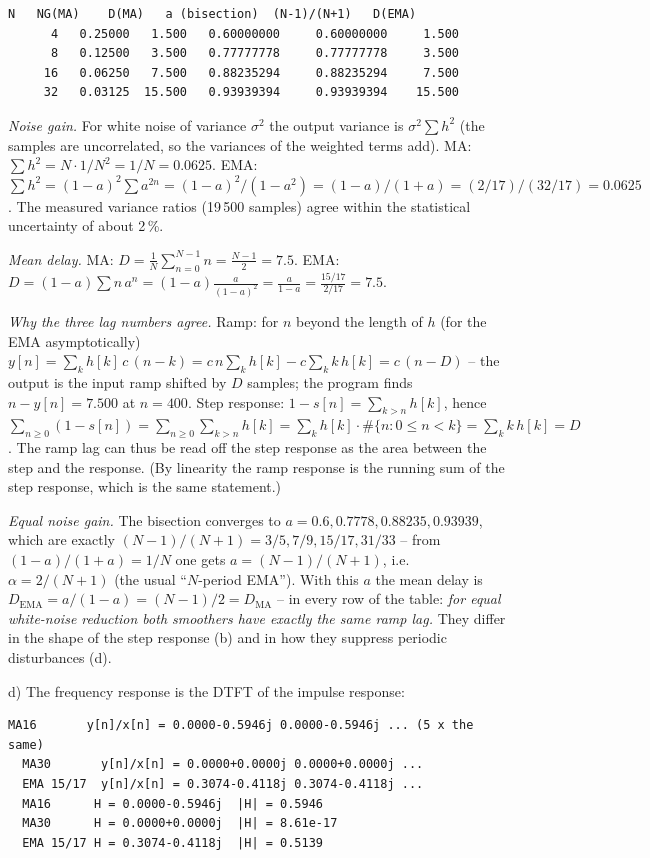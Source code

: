 \begin{solution}
\begin{lstlisting}[style=shell,numbers=none]
      N   NG(MA)    D(MA)   a (bisection)  (N-1)/(N+1)   D(EMA)
      4   0.25000   1.500   0.60000000     0.60000000     1.500
      8   0.12500   3.500   0.77777778     0.77777778     3.500
     16   0.06250   7.500   0.88235294     0.88235294     7.500
     32   0.03125  15.500   0.93939394     0.93939394    15.500
\end{lstlisting}
\emph{Noise gain.} For white noise of variance $\sigma^2$ the output variance is
$\sigma^2\sum h^2$ (the samples are uncorrelated, so the variances of the
weighted terms add). MA: $\sum h^2=N\cdot1/N^2=1/N=0.0625$. EMA:
$\sum h^2=(1-a)^2\sum a^{2n}=(1-a)^2/(1-a^2)=(1-a)/(1+a)=(2/17)/(32/17)=0.0625$.
The measured variance ratios (19\,500 samples) agree within the statistical
uncertainty of about 2\,\%.

\emph{Mean delay.} MA: $D=\frac1N\sum_{n=0}^{N-1}n=\frac{N-1}{2}=7.5$. EMA:
$D=(1-a)\sum n\,a^n=(1-a)\frac{a}{(1-a)^2}=\frac{a}{1-a}=\frac{15/17}{2/17}=7.5$.

\emph{Why the three lag numbers agree.} Ramp: for $n$ beyond the length of $h$
(for the EMA asymptotically)
$y[n]=\sum_k h[k]\,c\,(n-k)=c\,n\sum_k h[k]-c\sum_k k\,h[k]=c\,(n-D)$ -- the output
is the input ramp shifted by $D$ samples; the program finds $n-y[n]=7.500$ at
$n=400$. Step response: $1-s[n]=\sum_{k>n}h[k]$, hence
$\sum_{n\ge0}(1-s[n])=\sum_{n\ge0}\sum_{k>n}h[k]=\sum_k h[k]\cdot\#\{n:0\le n<k\}
=\sum_k k\,h[k]=D$. The ramp lag can thus be read off the step response as the
area between the step and the response. (By linearity the ramp response is the
running sum of the step response, which is the same statement.)

\emph{Equal noise gain.} The bisection converges to
$a=0.6, 0.7778, 0.88235, 0.93939$, which are exactly $(N-1)/(N+1)=3/5, 7/9, 15/17,
31/33$ -- from $(1-a)/(1+a)=1/N$ one gets $a=(N-1)/(N+1)$, i.e.\
$\alpha=2/(N+1)$ (the usual ``$N$-period EMA''). With this $a$ the mean delay is
$D_{\text{EMA}}=a/(1-a)=(N-1)/2=D_{\text{MA}}$ -- in every row of the table:
\emph{for equal white-noise reduction both smoothers have exactly the same
ramp lag.} They differ in the shape of the step response (b) and in how they
suppress periodic disturbances (d).

d) The frequency response is the DTFT of the impulse response:
\begin{lstlisting}[style=shell,numbers=none]
  MA16       y[n]/x[n] = 0.0000-0.5946j 0.0000-0.5946j ... (5 x the same)
  MA30       y[n]/x[n] = 0.0000+0.0000j 0.0000+0.0000j ...
  EMA 15/17  y[n]/x[n] = 0.3074-0.4118j 0.3074-0.4118j ...
  MA16      H = 0.0000-0.5946j  |H| = 0.5946
  MA30      H = 0.0000+0.0000j  |H| = 8.61e-17
  EMA 15/17 H = 0.3074-0.4118j  |H| = 0.5139


\end{lstlisting}
\end{solution}
